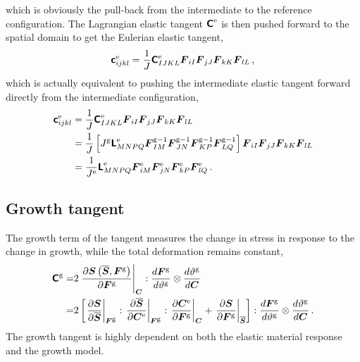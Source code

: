 \documentclass[10pt,letterpaper,oneside]{report}
\newcommand{\ten}[1]{\mbox{\boldmath $#1$}{}}
\newcommand{\tenf}[1]{\mbox{{\sffamily{\bfseries {#1}}}}}
\newcommand{\scas}[1]{\mbox{{\scriptsize{${\rm{#1}}$}}}{}}
\newcommand{\tens}[1]{\mbox{\boldmath{\scriptsize{$#1$}}}{}}
\begin{document}
which is obviously the pull-back from the intermediate to the reference configuration.  The Lagrangian elastic tangent $\tenf{C}^{\scas{e}}$ is then pushed forward to the spatial domain to get the Eulerian elastic tangent, 
\begin{equation}
\tenf{c}^{\scas{e}}_{ijkl} = \frac{1}{J} \tenf{C}^{\scas{e}}_{IJKL} \ten{F}_{iI} \ten{F}_{jJ} \ten{F}_{kK} \ten{F}_{lL} \, ,
\end{equation}
which is actually equivalent to pushing the intermediate elastic tangent forward directly from the intermediate configuration,
\begin{align}
\tenf{c}^{\scas{e}}_{ijkl} ={}& \frac{1}{J} \tenf{C}^{\scas{e}}_{IJKL} \ten{F}_{iI} \ten{F}_{jJ} \ten{F}_{kK} \ten{F}_{lL} \\
={}& \frac{1}{J} \left[ J^{\scas{g}} \tenf{L}^{\scas{e}}_{MNPQ} \ten{F}^{\scas{g}-1}_{IM} \ten{F}^{\scas{g}-1}_{JN} \ten{F}^{\scas{g}-1}_{KP} \ten{F}^{\scas{g}-1}_{LQ} \right] \ten{F}_{iI} \ten{F}_{jJ} \ten{F}_{kK} \ten{F}_{lL} \notag \\
={}& \frac{1}{J^{\scas{e}}} \tenf{L}^{\scas{e}}_{MNPQ} \ten{F}^{\scas{e}}_{iM} \ten{F}^{\scas{e}}_{jN} \ten{F}^{\scas{e}}_{kP}  \ten{F}^{\scas{e}}_{lQ} \, .  
\end{align}


\subsection{Growth tangent}
\label{subsec:growth_tangent}
The growth term of the tangent measures the change in stress in response to the change in growth, while the total deformation remains constant, 
\begin{align}
\tenf{C}^{\scas{g}} =& 2 \left. \frac{\partial \ten{S} \left( \overline{\ten{S}}, \ten{F}^{\scas{g}} \right)}{\partial \ten{F}^{\scas{g}} } \right|_{\tens{C}} : \frac{d \ten{F}^{\scas{g}} }{d \vartheta^{\scas{g}}} \otimes \frac{ d \vartheta^{\scas{g}} }{ d \ten{C} } 
\notag \\
=& 2 \left[ \left. \frac{\partial \ten{S} }{\partial \overline{\ten{S}} } \right|_{\tens{F}^{\scas{g}}} : \left. \frac{\partial \overline{\ten{S}} }{\partial \ten{C}^{\scas{e}} } \right|_{\tens{F}^{\scas{g}}} : \left. \frac{\partial \ten{C}^{\scas{e}} }{\partial \ten{F}^{\scas{g}} } \right|_{\tens{C}} 
+ \left. \frac{\partial \ten{S} }{\partial \ten{F}^{\scas{g}} } \right|_{\overline{\tens{S}}} \right] : \frac{d \ten{F}^{\scas{g}} }{d \vartheta^{\scas{g}}} \otimes \frac{ d \vartheta^{\scas{g}} }{ d \ten{C} } \, .  
\label{growth_tangent}
\end{align}
The growth tangent is highly dependent on both the elastic material response and the growth model.
\end{document}
